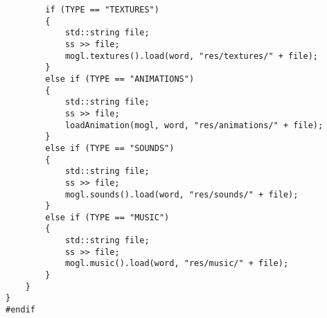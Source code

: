 \begin{lstlisting}
        if (TYPE == "TEXTURES")
        {
            std::string file;
            ss >> file;
            mogl.textures().load(word, "res/textures/" + file);
        }
        else if (TYPE == "ANIMATIONS")
        {
            std::string file;
            ss >> file;
            loadAnimation(mogl, word, "res/animations/" + file);
        }
        else if (TYPE == "SOUNDS")
        {
            std::string file;
            ss >> file;
            mogl.sounds().load(word, "res/sounds/" + file);
        }
        else if (TYPE == "MUSIC")
        {
            std::string file;
            ss >> file;
            mogl.music().load(word, "res/music/" + file);
        }
    }
}
#endif
\end{lstlisting}

